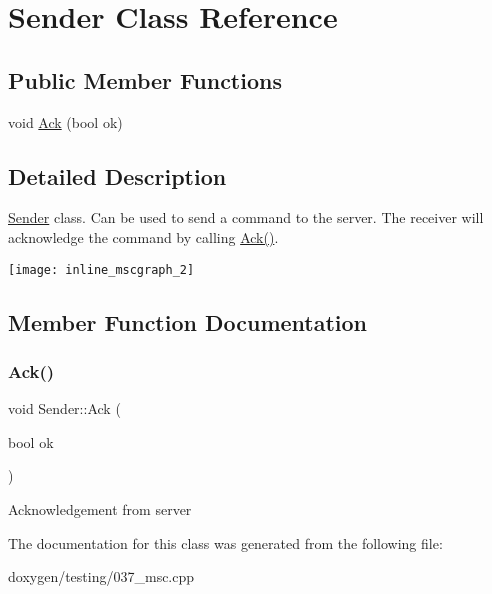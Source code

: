 \hypertarget{class_sender}{}\section{Sender Class Reference}
\label{class_sender}
\subsection*{Public Member Functions}
\begin{DoxyCompactItemize}
\item 
void \mbox{\hyperlink{class_sender_a8ad2c6f9baa4e798868fe4a4d45f8fda}{Ack}} (bool ok)
\end{DoxyCompactItemize}


\subsection{Detailed Description}
\mbox{\hyperlink{class_sender}{Sender}} class. Can be used to send a command to the server. The receiver will acknowledge the command by calling \mbox{\hyperlink{class_sender_a8ad2c6f9baa4e798868fe4a4d45f8fda}{Ack()}}. 
\begin{DoxyImageNoCaption}
  \mbox{\texttt{[image: inline\_mscgraph\_2]}}
\end{DoxyImageNoCaption}
 

\subsection{Member Function Documentation}
\mbox{\label{class_sender_a8ad2c6f9baa4e798868fe4a4d45f8fda}} 
\subsubsection{\texorpdfstring{Ack()}{Ack()}}
{\footnotesize\ttfamily void Sender\+::\+Ack (\begin{DoxyParamCaption}\item[{bool}]{ok }\end{DoxyParamCaption})}

Acknowledgement from server 

The documentation for this class was generated from the following file\+:\begin{DoxyCompactItemize}
\item 
doxygen/testing/037\+\_\+msc.\+cpp\end{DoxyCompactItemize}
